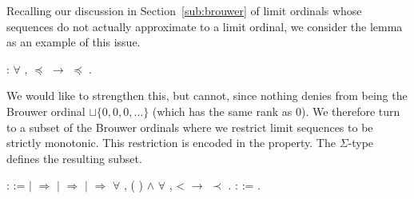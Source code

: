 Recalling our discussion in Section~\ref{sub:brouwer} of limit ordinals whose
sequences do not actually approximate to a limit ordinal, we consider the
lemma
as an example of this issue.
\begin{singlespace}
\begin{coqdoccode}
\coqdocnoindent
{}
:
\ensuremath{\forall} \coqdocvar{\ensuremath{\alpha}} \coqdocvar{\ensuremath{\beta}},
\coqdocvariable{\ensuremath{\alpha}} \ensuremath{\preceq}
\ensuremath{\rightarrow}
\coqdocvariable{\ensuremath{\alpha}} \ensuremath{\preceq}
\coqdocvariable{\ensuremath{\beta}}.\coqdoceol
\end{coqdoccode}
\end{singlespace}
We would like to strengthen this, but cannot, since nothing denies
\coqdocvariable{$\alpha$} from being the Brouwer ordinal $\sqcup \{ 0, 0, 0,
\ldots \}$ (which has the same rank as $0$). We therefore turn to a subset of
the Brouwer ordinals where we restrict limit sequences to be strictly
monotonic. This restriction is encoded in the
 property. The $\Sigma$-type
 defines the
resulting subset.
\begin{singlespace}
\begin{coqdoccode}
\coqdocnoindent
{} 
\coqdocvar{\ensuremath{\alpha}} :  :=\coqdoceol
\coqdocindent{1.00em}
 \coqdocvariable{\ensuremath{\alpha}} \coqdoceol
\coqdocindent{1.00em}
\ensuremath{|} 
\ensuremath{\Rightarrow}
\coqdoceol
\coqdocindent{1.00em}
\ensuremath{|} 
\coqdocvar{\ensuremath{\beta}} \ensuremath{\Rightarrow}
 \coqdocvariable{\ensuremath{\beta}}\coqdoceol
\coqdocindent{1.00em}
\ensuremath{|}  
\ensuremath{\Rightarrow} \ensuremath{\forall} ,
 (
) \ensuremath{\land} \ensuremath{\forall} ,
 <  \ensuremath{\rightarrow}
  \ensuremath{\prec}
 \coqdoceol
\coqdocindent{1.00em}
.\coqdoceol
\coqdocemptyline
\coqdocnoindent
{}
 : 
:=
.\coqdoceol
\end{coqdoccode}
\end{singlespace}
